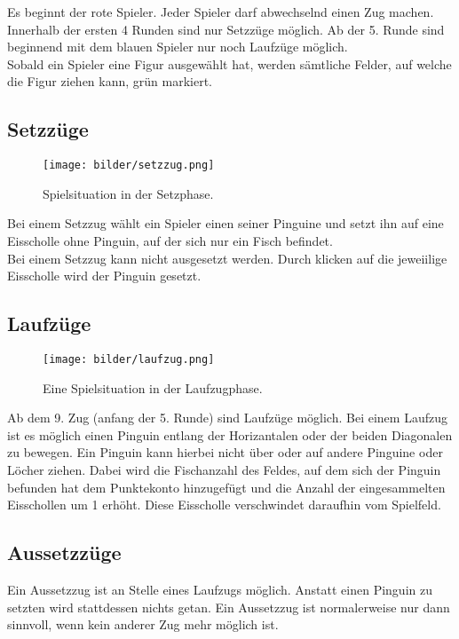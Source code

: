 \documentclass[a4paper, ngerman]{scrartcl}
\begin{document}
	Es beginnt der rote Spieler. Jeder Spieler darf abwechselnd einen
	Zug machen. Innerhalb der ersten 4 Runden sind nur Setzzüge möglich. Ab der
	5.
	Runde sind beginnend mit dem blauen Spieler nur noch Laufzüge möglich.\\
	Sobald ein Spieler eine Figur ausgewählt hat, werden sämtliche Felder, auf
	welche die Figur ziehen kann, grün markiert.
	
	
	
	\subsection{Setzzüge}
	
	\begin{figure}[h!]
		\centering
		\texttt{[image: bilder/setzzug.png]}
		\caption{Spielsituation in der Setzphase.}
		\label{fig:Setzzug}
	\end{figure}
	Bei einem Setzzug wählt ein Spieler einen seiner
	Pinguine und setzt ihn auf eine Eisscholle ohne Pinguin, auf der sich nur ein
	Fisch befindet.\\
	Bei einem Setzzug kann nicht ausgesetzt werden. Durch klicken auf die
	jeweiilige Eisscholle wird der Pinguin gesetzt. 
	
	
	 
\subsection{Laufzüge}
	 
	\begin{figure}[h!]
		\centering
		\texttt{[image: bilder/laufzug.png]}
		\caption{Eine Spielsituation in der Laufzugphase.}
		\label{fig:Laufzug}
	\end{figure}
	
Ab dem 9. Zug (anfang der 5. Runde) sind Laufzüge möglich. Bei einem Laufzug
ist es möglich einen Pinguin entlang der Horizantalen oder der beiden Diagonalen
zu bewegen. Ein Pinguin kann hierbei nicht über oder auf andere Pinguine oder
Löcher ziehen. Dabei wird die Fischanzahl des Feldes, auf dem sich der Pinguin
befunden hat dem Punktekonto hinzugefügt und die Anzahl der eingesammelten 
Eisschollen um 1 erhöht. Diese Eisscholle verschwindet daraufhin vom Spielfeld.



\subsection{Aussetzzüge}
Ein Aussetzzug ist an Stelle eines Laufzugs möglich. Anstatt einen Pinguin zu
setzten wird stattdessen nichts getan. Ein Aussetzzug ist normalerweise nur dann
sinnvoll, wenn kein anderer Zug mehr möglich ist.
	
\end{document}

